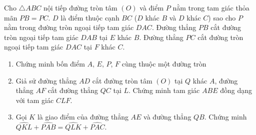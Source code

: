 \begin{ex}%
Cho $\triangle ABC$ nội tiếp đường tròn tâm $(O)$ và điểm $P$ nằm trong tam giác thỏa mãn $PB = PC$. $D$ là điểm thuộc cạnh $BC$ ($D$ khác $B$ và $D$ khác $C$) sao cho $P$ nằm trong đường tròn ngoại tiếp tam giác $DAC$. Đường thẳng $PB$ cắt đường tròn ngoại tiếp tam giác $DAB$ tại $E$ khác $B$. Đường thẳng $PC$ cắt đường tròn ngoại tiếp tam giác $DAC$ tại $F$ khác $C$.

\begin{enumerate}[1)]  
\item Chứng minh bốn điểm $A$, $E$, $P$, $F$ cùng thuộc một đường tròn
\item Giả sử đường thẳng $AD$ cắt đường tròn tâm $(O)$ tại $Q$ khác $A$, đường thẳng $AF$ cắt đường thẳng $QC$ tại $L$. Chứng minh tam giác $ABE$ đồng dạng với tam giác $CLF$.
\item Gọi $K$ là giao điểm của đường thẳng $AE$ và đường thẳng $QB$. Chứng minh $\widehat{QKL} +\widehat{PAB} = \widehat{QLK}+\widehat{PAC}$.

\end{enumerate}


\loigiai
	{
\begin{center}
\end{center}
	
}
\end{ex}

